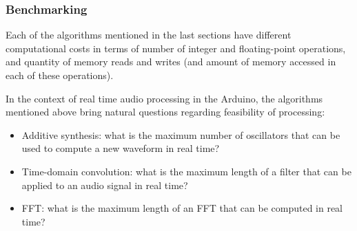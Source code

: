 


\subsubsection{Benchmarking}

Each of the algorithms mentioned in the last sections have different
computational costs in terms of number of integer and floating-point
operations, and quantity of memory reads and writes (and amount of memory
accessed in each of these operations). 

In the context of real time audio processing in the Arduino, the algorithms mentioned above
bring natural questions regarding feasibility of processing:

\begin{itemize}
  \item Additive synthesis: what is the maximum number of oscillators that can
  be used to compute a new waveform in real time?
  \item Time-domain convolution: what is the maximum length of a filter that
  can be applied to an audio signal in real time?
  \item FFT: what is the maximum length of an FFT that can be computed in real time?
\end{itemize}

